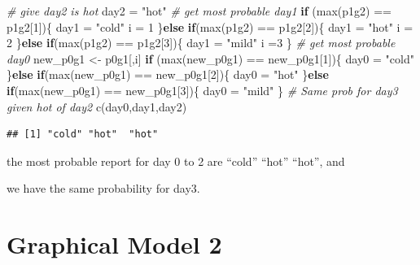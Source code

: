 \documentclass[
]{article}
\newenvironment{Shaded}{\begin{snugshade}}{\end{snugshade}}
\newcommand{\CommentTok}[1]{\textcolor[rgb]{0.56,0.35,0.01}{\textit{#1}}}
\newcommand{\ControlFlowTok}[1]{\textcolor[rgb]{0.13,0.29,0.53}{\textbf{#1}}}
\newcommand{\DecValTok}[1]{\textcolor[rgb]{0.00,0.00,0.81}{#1}}
\newcommand{\FunctionTok}[1]{\textcolor[rgb]{0.00,0.00,0.00}{#1}}
\newcommand{\NormalTok}[1]{#1}
\newcommand{\OtherTok}[1]{\textcolor[rgb]{0.56,0.35,0.01}{#1}}
\newcommand{\SpecialCharTok}[1]{\textcolor[rgb]{0.00,0.00,0.00}{#1}}
\newcommand{\StringTok}[1]{\textcolor[rgb]{0.31,0.60,0.02}{#1}}
\begin{document}
\begin{Shaded}
\begin{Highlighting}[]
\CommentTok{\# give day2 is hot}
\NormalTok{day2 }\OtherTok{=} \StringTok{"hot"}
\CommentTok{\# get most probable day1}
\ControlFlowTok{if}\NormalTok{ (}\FunctionTok{max}\NormalTok{(p1g2) }\SpecialCharTok{==}\NormalTok{ p1g2[}\DecValTok{1}\NormalTok{])\{}
\NormalTok{  day1 }\OtherTok{=} \StringTok{"cold"}
\NormalTok{  i }\OtherTok{=} \DecValTok{1}
\NormalTok{\}}\ControlFlowTok{else} \ControlFlowTok{if}\NormalTok{(}\FunctionTok{max}\NormalTok{(p1g2) }\SpecialCharTok{==}\NormalTok{ p1g2[}\DecValTok{2}\NormalTok{])\{}
\NormalTok{  day1 }\OtherTok{=} \StringTok{"hot"}
\NormalTok{  i }\OtherTok{=} \DecValTok{2}
\NormalTok{\}}\ControlFlowTok{else} \ControlFlowTok{if}\NormalTok{(}\FunctionTok{max}\NormalTok{(p1g2) }\SpecialCharTok{==}\NormalTok{ p1g2[}\DecValTok{3}\NormalTok{])\{}
\NormalTok{  day1 }\OtherTok{=} \StringTok{"mild"}
\NormalTok{  i }\OtherTok{=}\DecValTok{3}
\NormalTok{\}}
\CommentTok{\# get most probable day0}
\NormalTok{new\_p0g1 }\OtherTok{\textless{}{-}}\NormalTok{ p0g1[,i]}
\ControlFlowTok{if}\NormalTok{ (}\FunctionTok{max}\NormalTok{(new\_p0g1) }\SpecialCharTok{==}\NormalTok{ new\_p0g1[}\DecValTok{1}\NormalTok{])\{}
\NormalTok{  day0 }\OtherTok{=} \StringTok{"cold"}
\NormalTok{\}}\ControlFlowTok{else} \ControlFlowTok{if}\NormalTok{(}\FunctionTok{max}\NormalTok{(new\_p0g1) }\SpecialCharTok{==}\NormalTok{ new\_p0g1[}\DecValTok{2}\NormalTok{])\{}
\NormalTok{  day0 }\OtherTok{=} \StringTok{"hot"}
\NormalTok{\}}\ControlFlowTok{else} \ControlFlowTok{if}\NormalTok{(}\FunctionTok{max}\NormalTok{(new\_p0g1) }\SpecialCharTok{==}\NormalTok{ new\_p0g1[}\DecValTok{3}\NormalTok{])\{}
\NormalTok{  day0 }\OtherTok{=} \StringTok{"mild"}
\NormalTok{\}}
\CommentTok{\# Same prob for day3 given hot of day2}
\FunctionTok{c}\NormalTok{(day0,day1,day2)}
\end{Highlighting}
\end{Shaded}

\begin{verbatim}
## [1] "cold" "hot"  "hot"
\end{verbatim}

the most probable report for day 0 to 2 are ``cold'' ``hot'' ``hot'',
and

we have the same probability for day3.

\hypertarget{graphical-model-2}{%
\section{Graphical Model 2}\label{graphical-model-2}}
\end{document}
